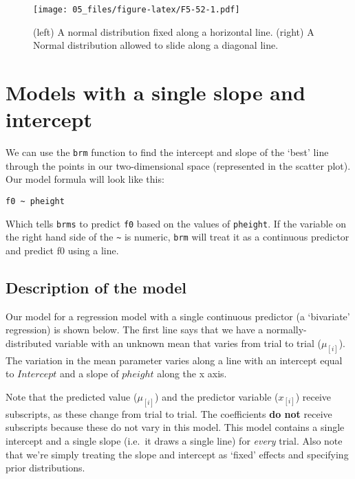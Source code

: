 \documentclass[
]{book}
\begin{document}
\begin{figure}
\centering
\texttt{[image: 05\_files/figure-latex/F5-52-1.pdf]}
\caption{\label{fig:F5-52}(left) A normal distribution fixed along a horizontal line. (right) A Normal distribution allowed to slide along a diagonal line.}
\end{figure}

\hypertarget{models-with-a-single-slope-and-intercept}{%
\section{Models with a single slope and intercept}\label{models-with-a-single-slope-and-intercept}}

We can use the \texttt{brm} function to find the intercept and slope of the `best' line through the points in our two-dimensional space (represented in the scatter plot). Our model formula will look like this:

\texttt{f0\ \textasciitilde{}\ pheight}

Which tells \texttt{brms} to predict \texttt{f0} based on the values of \texttt{pheight}. If the variable on the right hand side of the \texttt{\textasciitilde{}} is numeric, \texttt{brm} will treat it as a continuous predictor and predict f0 using a line.

\hypertarget{description-of-the-model-4}{%
\subsection{Description of the model}\label{description-of-the-model-4}}

Our model for a regression model with a single continuous predictor (a `bivariate' regression) is shown below. The first line says that we have a normally-distributed variable with an unknown mean that varies from trial to trial (\(\mu_{[i]}\)). The variation in the mean parameter varies along a line with an intercept equal to \(Intercept\) and a slope of \(pheight\) along the x axis.

Note that the predicted value (\(\mu_{[i]}\)) and the predictor variable (\(x_{[i]}\)) receive subscripts, as these change from trial to trial. The coefficients \textbf{do not} receive subscripts because these do not vary in this model. This model contains a single intercept and a single slope (i.e.~it draws a single line) for \emph{every} trial. Also note that we're simply treating the slope and intercept as `fixed' effects and specifying prior distributions.
\end{document}
